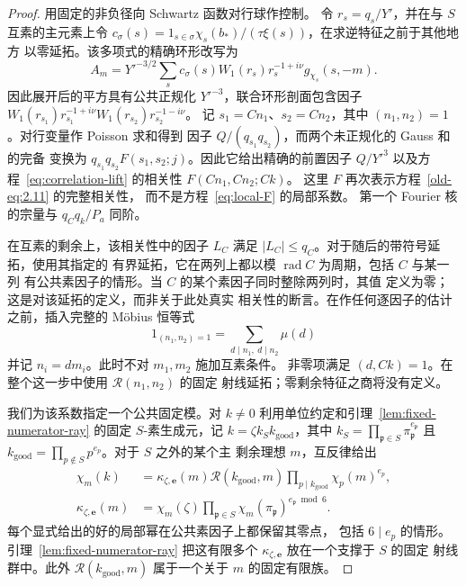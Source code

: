 \begin{proof}
用固定的非负径向 Schwartz 函数对行球作控制。
令 $r_s=q_s/Y'$，并在与 $S$ 互素的主元素上令
$c_\sigma(s)=1_{s\in\sigma}\chi_s(b_*)/(\tau\xi(s))$，在求逆特征之前于其他地方
以零延拓。该多项式的精确环形改写为
\[
 A_m=Y'^{-3/2}\sum_s c_\sigma(s)W_1(r_s)r_s^{-1+i\nu}
                          g_{\chi_s}(s,-m).
\]
因此展开后的平方具有公共正规化 $Y'^{-3}$，联合环形剖面包含因子
$W_1(r_{s_1})r_{s_1}^{-1+i\nu}W_1(r_{s_2})r_{s_2}^{-1-i\nu}$。
记 $s_1=Cn_1$、$s_2=Cn_2$，其中 $(n_1,n_2)=1$。对行变量作 Poisson 求和得到
因子 $Q/(q_{s_1}q_{s_2})$，而两个未正规化的 Gauss 和的完备
变换为 $q_{s_1}q_{s_2}F(s_1,s_2;j)$。因此它给出精确的前置因子
$Q/Y'^3$ 以及方程~\eqref{eq:correlation-lift} 的相关性
$F(Cn_1,Cn_2;Ck)$。
这里 $F$ 再次表示方程~\eqref{old-eq:2.11} 的完整相关性，
而不是方程~\eqref{eq:local-F} 的局部系数。
第一个 Fourier 核的宗量与 $q_Cq_k/P_a$ 同阶。

在互素的剩余上，该相关性中的因子 $L_C$ 满足
$|L_C|\le q_C$。对于随后的带符号延拓，使用其指定的
有界延拓，它在两列上都以模 $\operatorname{rad}C$ 为周期，包括 $C$ 与某一列
有公共素因子的情形。当 $C$ 的某个素因子同时整除两列时，其值
定义为零；这是对该延拓的定义，而非关于此处真实
相关性的断言。在作任何逐因子的估计之前，插入完整的
M\"obius 恒等式
\[
 1_{(n_1,n_2)=1}=\sum_{d\mid n_1,\ d\mid n_2}\mu(d)
\]
并记 $n_i=dm_i$。此时不对 $m_1,m_2$ 施加互素条件。
非零项满足 $(d,Ck)=1$。在整个这一步中使用 $\mathcal R(n_1,n_2)$ 的固定
射线延拓；零剩余特征之商将没有定义。

我们为该系数指定一个公共固定模。对 $k\ne0$
利用单位约定和引理~\ref{lem:fixed-numerator-ray} 的固定 $S$-素生成元，记
$k=\zeta k_Sk_{\mathrm{good}}$，其中
$k_S=\prod_{\mathfrak p\in S}\pi_{\mathfrak p}^{e_{\mathfrak p}}$
且 $k_{\mathrm{good}}=\prod_{p\notin S}p^{e_p}$。对于 $S$ 之外的某个主
剩余理想 $m$，互反律给出
\[
 \begin{split}
 \chi_m(k)&=\kappa_{\zeta,\boldsymbol e}(m)
       \mathcal R(k_{\mathrm{good}},m)
       \prod_{p\mid k_{\mathrm{good}}}\chi_p(m)^{e_p},\\
 \kappa_{\zeta,\boldsymbol e}(m)
       &=\chi_m(\zeta)\prod_{\mathfrak p\in S}
             \chi_m(\pi_{\mathfrak p})^{e_{\mathfrak p}\bmod6}.
 \end{split}
\]
每个显式给出的好的局部幂在公共素因子上都保留其零点，
包括 $6\mid e_p$ 的情形。引理~\ref{lem:fixed-numerator-ray}
把这有限多个 $\kappa_{\zeta,\boldsymbol e}$ 放在一个支撑于 $S$ 的固定
射线群中。此外 $\mathcal R(k_{\mathrm{good}},m)$
属于一个关于 $m$ 的固定有限族。


\end{proof}
